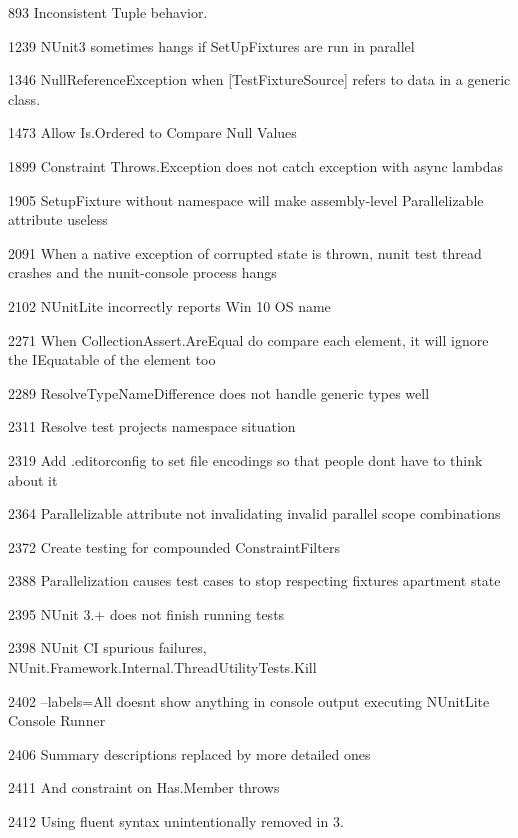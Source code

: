 \begin{DoxyItemize}
\item 893 Inconsistent Tuple behavior.
\item 1239 N\+Unit3 sometimes hangs if Set\+Up\+Fixtures are run in parallel
\item 1346 Null\+Reference\+Exception when [Test\+Fixture\+Source] refers to data in a generic class.
\item 1473 Allow Is.\+Ordered to Compare Null Values
\item 1899 Constraint Throws.\+Exception does not catch exception with async lambdas
\item 1905 Setup\+Fixture without namespace will make assembly-\/level Parallelizable attribute useless
\item 2091 When a native exception of corrupted state is thrown, nunit test thread crashes and the nunit-\/console process hangs
\item 2102 N\+Unit\+Lite incorrectly reports Win 10 OS name
\item 2271 When Collection\+Assert.\+Are\+Equal do compare each element, it will ignore the I\+Equatable of the element too
\item 2289 Resolve\+Type\+Name\+Difference does not handle generic types well
\item 2311 Resolve test projects\textquotesingle{} namespace situation
\item 2319 Add .editorconfig to set file encodings so that people don\textquotesingle{}t have to think about it
\item 2364 Parallelizable attribute not invalidating invalid parallel scope combinations
\item 2372 Create testing for compounded Constraint\+Filters
\item 2388 Parallelization causes test cases to stop respecting fixture\textquotesingle{}s apartment state
\item 2395 N\+Unit 3.+ does not finish running tests
\item 2398 N\+Unit CI spurious failures, N\+Unit.\+Framework.\+Internal.\+Thread\+Utility\+Tests.\+Kill
\item 2402 --labels=All doesn\textquotesingle{}t show anything in console output executing N\+Unit\+Lite Console Runner
\item 2406 Summary descriptions replaced by more detailed ones
\item 2411 And constraint on Has.\+Member throws
\item 2412 Using fluent syntax unintentionally removed in 3.

\end{DoxyItemize}
